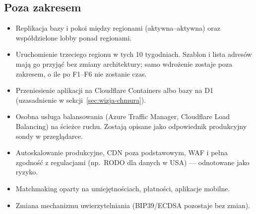 \subsection{Poza zakresem}
\begin{itemize}
  \item Replikacja bazy i pokoi między regionami (aktywna--aktywna) oraz
        współdzielone lobby ponad regionami.
  \item Uruchomienie trzeciego regionu w tych 10 tygodniach. Szablon i lista
        adresów mają go przyjąć bez zmiany architektury; samo wdrożenie zostaje
        poza zakresem, o ile po F1--F6 nie zostanie czas.
  \item Przeniesienie aplikacji na Cloudflare Containers albo bazy na D1
        (uzasadnienie w sekcji~\ref{sec:wizja-chmura}).
  \item Osobna usługa balansowania (Azure Traffic Manager, Cloudflare Load
        Balancing) na ścieżce ruchu. Zostają opisane jako odpowiednik produkcyjny
        sondy w przeglądarce.
  \item Autoskalowanie produkcyjne, CDN poza podstawowym, WAF i pełna zgodność
        z regulacjami (np.\ RODO dla danych w USA) --- odnotowane jako ryzyko.
  \item Matchmaking oparty na umiejętnościach, płatności, aplikacje mobilne.
  \item Zmiana mechanizmu uwierzytelniania (BIP39/ECDSA pozostaje bez zmian).
\end{itemize}


